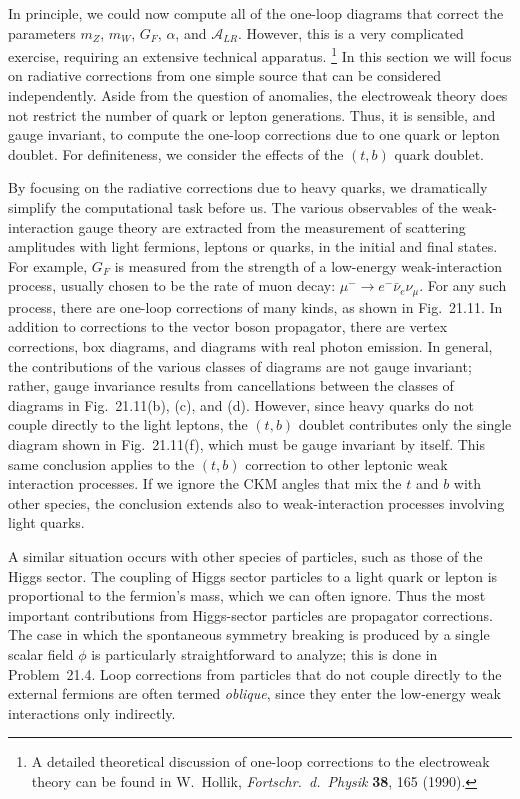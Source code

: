 In principle, we could now compute all of the one-loop diagrams that correct
the parameters $m_Z$, $m_W$, $G_F$, $\alpha$, and $\mathcal{A}_{LR}$.
However, this is a very complicated exercise, requiring an extensive
technical apparatus.%
\footnote{A detailed theoretical discussion of one-loop corrections to the
electroweak theory can be found in W.~Hollik, \emph{Fortschr.\ d.\ Physik}
\textbf{38}, 165 (1990).}  In this section we will focus on radiative
corrections from one simple source that can be considered independently.
Aside from the question of anomalies, the electroweak theory does not
restrict the number of quark or lepton generations.  Thus, it is sensible,
and gauge invariant, to compute the one-loop corrections due to one quark or
lepton doublet.  For definiteness, we consider the effects of the $(t, b)$
quark doublet.

By focusing on the radiative corrections due to heavy quarks, we
dramatically simplify the computational task before us.  The various
observables of the weak-interaction gauge theory are extracted from the
measurement of scattering amplitudes with light fermions, leptons or quarks,
in the initial and final states.  For example, $G_F$ is measured from the
strength of a low-energy weak-interaction process, usually chosen to be the
rate of muon decay: $\mu^{-}\to e^{-}\bar{\nu}_e\nu_\mu$.  For any such
process, there are one-loop corrections of many kinds, as shown in
Fig.~21.11.  In addition to corrections to the vector boson
propagator, there are vertex corrections, box diagrams, and diagrams with
real photon emission.  In general, the contributions of the various classes
of diagrams are not gauge invariant; rather, gauge invariance results from
cancellations between the classes of diagrams in Fig.~21.11(b),
(c), and (d).  However, since heavy quarks do not couple directly to the
light leptons, the $(t, b)$ doublet contributes only the single diagram shown
in Fig.~21.11(f), which must be gauge invariant by itself.  This
same conclusion applies to the $(t, b)$ correction to other leptonic weak
interaction processes.  If we ignore the CKM angles that mix the $t$ and $b$
with other species, the conclusion extends also to weak-interaction
processes involving light quarks.

A similar situation occurs with other species of particles, such as those of
the Higgs sector.  The coupling of Higgs sector particles to a light quark or
lepton is proportional to the fermion's mass, which we can often ignore.
Thus the most important contributions from Higgs-sector particles are
propagator corrections.  The case in which the spontaneous symmetry breaking
is produced by a single scalar field $\phi$ is particularly straightforward
to analyze; this is done in Problem~21.4.  Loop corrections from particles
that do not couple directly to the external fermions are often termed
\emph{oblique}, since they enter the low-energy weak interactions only
indirectly.

